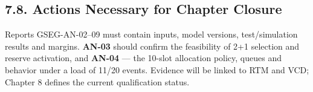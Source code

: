 \subsection{7.8. Actions Necessary for Chapter Closure}\label{ddjf-7-8}

Reports GSEG-AN-02–09 must contain inputs, model versions, test/\allowbreak{}simulation results and margins. \textbf{AN-03} should confirm the feasibility of 2+1 selection and reserve activation, and \textbf{AN-04} — the 10-slot allocation policy, queues and behavior under a load of 11/\allowbreak{}20 events. Evidence will be linked to RTM and VCD; Chapter 8 defines the current qualification status.

\par\noindent{\color{TableBorderBlue}\rule{\linewidth}{0.4pt}}\par
